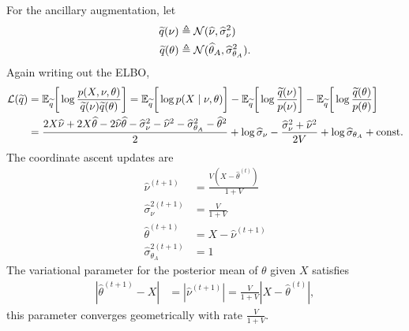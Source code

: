 \documentclass{article}
\begin{document}
 For the ancillary augmentation, let
\begin{align}
\widetilde q(\nu)
&\triangleq \mathcal{N}(\widehat{\nu},\widehat\sigma_\nu^2) \\
\widetilde q(\theta)
&\triangleq \mathcal{N}(\widehat\theta_A,\widehat\sigma_{\theta_A}^2).
\end{align}
Again writing out the ELBO,
\begin{align}
\mathcal{L}(\widetilde q)
&=\mathbb{E}_{\widetilde q}\bigg[\log \frac{p(X,\nu,\theta)}{\widetilde q(\nu)\widetilde q(\theta)}\bigg] 
=  \mathbb{E}_{\widetilde q}\bigg[\log p(X\mid \nu,\theta)\bigg]
-  \mathbb{E}_{\widetilde q}\bigg[\log\frac{\widetilde q(\nu)}{p(\nu)} \bigg]
-  \mathbb{E}_{\widetilde q}\bigg[\log \frac{\widetilde q(\theta)}{p(\theta)}\bigg] \\
&=  \frac{2X\widehat\nu+2X\widehat\theta - 2\widehat\nu\widehat\theta - \widehat\sigma_\nu^2-\widehat\nu^2-\widehat\sigma_{\theta_A}^2-\widehat\theta^2}{2}
+\log\widehat\sigma_\nu - \frac{\widehat\sigma_\nu^{2} + \widehat\nu^2}{2V}
+\log \widehat{\sigma}_{\theta_A} 
+ \text{const.}
\end{align}
The coordinate ascent updates are
\begin{align}
\widehat\nu^{(t+1)}
&= \frac{V(X - \widehat\theta^{(t)})}{1+V} \\%
\widehat\sigma^{2(t+1)}_{\nu}
&= \frac{V}{1+V} \\
\widehat\theta^{(t+1)}
&= X-\widehat\nu^{(t+1)} \\
\widehat\sigma^{2(t+1)}_{\theta_A}
&= 1
\end{align}
The variational parameter for the posterior mean of $\theta$ given $X$ satisfies
\begin{align}
\left|\widehat\theta^{(t+1)} - X\right|
&= \left|\widehat\nu^{(t+1)}\right| 
= \frac{V}{1+V}\left|X - \widehat\theta^{(t)}\right|,
\end{align}
this parameter converges geometrically with rate $\frac{V}{1+V}$. \\
\end{document}
